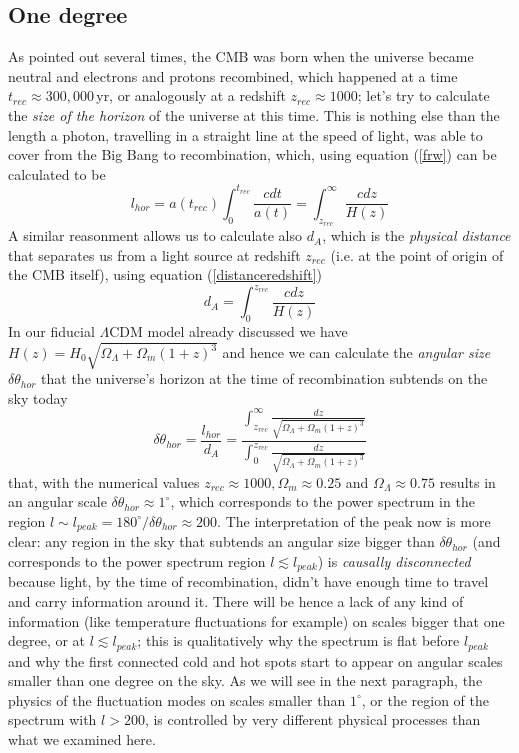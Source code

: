 \subsection{One degree}
As pointed out several times, the CMB was born when the universe became neutral and electrons and protons recombined, which happened at a time $t_{rec}\approx 300,000\,$yr, or analogously at a redshift $z_{rec}\approx 1000$; let's try to calculate the \textit{size of the horizon} of the universe at this time. This is nothing else than the length a photon, travelling in a straight line at the speed of light, was able to cover from the Big Bang to recombination, which, using equation (\ref{frw}) can be calculated to be
\begin{equation}
l_{hor}=a(t_{rec})\int_0^{t_{rec}}\frac{cdt}{a(t)}=\int_{z_{rec}}^\infty\frac{cdz}{H(z)}
\end{equation} 
A similar reasonment allows us to calculate also $d_A$, which is the \textit{physical distance} that separates us from a light source at redshift $z_{rec}$ (i.e. at the point of origin of the CMB itself), using equation (\ref{distanceredshift})
\begin{equation}
d_A=\int_0^{z_{rec}}\frac{cdz}{H(z)}
\end{equation} 
In our fiducial $\Lambda$CDM model already discussed we have $H(z)=H_0\sqrt{\Omega_\Lambda + \Omega_m(1+z)^3}$ and hence we can calculate the \textit{angular size} $\delta \theta_{hor}$ that the universe's horizon at the time of recombination subtends on the sky today
\begin{equation}
\delta\theta_{hor}=\frac{l_{hor}}{d_A}=\frac{\int_{z_{rec}}^\infty\frac{dz}{\sqrt{\Omega_\Lambda + \Omega_m(1+z)^3}}}{\int_{0}^{z_{rec}}\frac{dz}{\sqrt{\Omega_\Lambda + \Omega_m(1+z)^3}}}
\end{equation}
that, with the numerical values $z_{rec}\approx 1000, \Omega_m\approx 0.25$ and $\Omega_\Lambda\approx 0.75$ results in an angular scale $\delta\theta_{hor}\approx 1^\circ$, which corresponds to the power spectrum in the region $l\sim l_{peak}=180^\circ/\delta\theta_{hor}\approx 200$. The interpretation of the peak now is more clear: any region in the sky that subtends an angular size bigger than $\delta\theta_{hor}$ (and corresponds to the power spectrum region $l\lesssim l_{peak}$) is \textit{causally disconnected} because light, by the time of recombination, didn't have enough time to travel and carry information around it. There will be hence a lack of any kind of information (like temperature fluctuations for example) on scales bigger that one degree, or at $l\lesssim l_{peak}$;  this is qualitatively why the spectrum is flat before $l_{peak}$ and why the first connected cold and hot spots start to appear on angular scales smaller than one degree on the sky. As we will see in the next paragraph, the 
physics of the fluctuation modes on scales smaller than $1^\circ$, or the region of the spectrum with $l>200$, is controlled by very different physical processes than what we examined here. 
